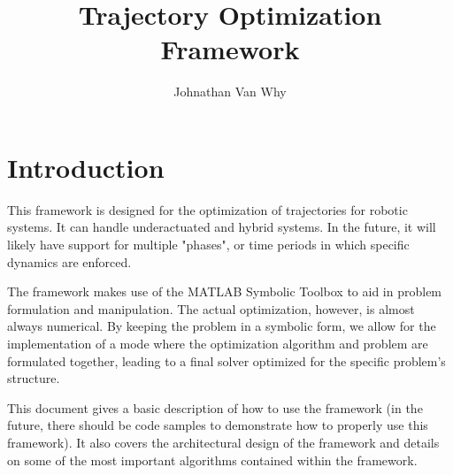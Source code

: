 \documentclass[12pt]{article}
\title{Trajectory Optimization Framework}
\author{Johnathan Van Why}
\begin{document}
	\maketitle
	\section{Introduction}
		This framework is designed for the optimization of trajectories for robotic systems.
		It can handle underactuated and hybrid systems. In the future, it will likely have support for multiple
		"phases", or time periods in which specific dynamics are enforced.

		The framework makes use of the MATLAB Symbolic Toolbox to aid in problem formulation and manipulation.
		The actual optimization, however, is almost always numerical. By keeping the problem in a symbolic form, we
		allow for the implementation of a mode where the optimization algorithm and problem are formulated together, leading
		to a final solver optimized for the specific problem's structure.

		This document gives a basic description of how to use the framework (in the future, there should be code samples
		to demonstrate how to properly use this framework). It also covers the architectural design of the framework
		and details on some of the most important algorithms contained within the framework.
\end{document}
